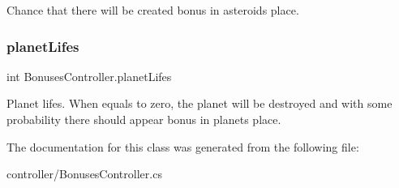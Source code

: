 Chance that there will be created bonus in asteroid\textquotesingle{}s place. 

\mbox{\label{class_bonuses_controller_a14eaa862f70cb157749cb0978ef5bd96}} 
\subsubsection{\texorpdfstring{planet\+Lifes}{planetLifes}}
{\footnotesize\ttfamily int Bonuses\+Controller.\+planet\+Lifes}



Planet lifes. When equals to zero, the planet will be destroyed and with some probability there should appear bonus in planet\textquotesingle{}s place. 



The documentation for this class was generated from the following file\+:\begin{DoxyCompactItemize}
\item 
controller/Bonuses\+Controller.\+cs\end{DoxyCompactItemize}
